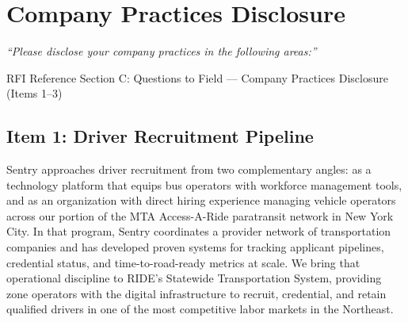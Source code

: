 \section{\texorpdfstring{\color{MidnightBlue}Company Practices Disclosure}{Company Practices Disclosure}}

\textit{``Please disclose your company practices in the following areas:''}

\begin{sidebar}{RFI Reference}
Section C: Questions to Field --- Company Practices Disclosure (Items 1--3)
\end{sidebar}

\subsection{Item 1: Driver Recruitment Pipeline}

Sentry approaches driver recruitment from two complementary angles: as a technology platform that equips bus operators with workforce management tools, and as an organization with direct hiring experience managing vehicle operators across our portion of the MTA Access-A-Ride paratransit network in New York City. In that program, Sentry coordinates a provider network of transportation companies and has developed proven systems for tracking applicant pipelines, credential status, and time-to-road-ready metrics at scale. We bring that operational discipline to RIDE's Statewide Transportation System, providing zone operators with the digital infrastructure to recruit, credential, and retain qualified drivers in one of the most competitive labor markets in the Northeast.

